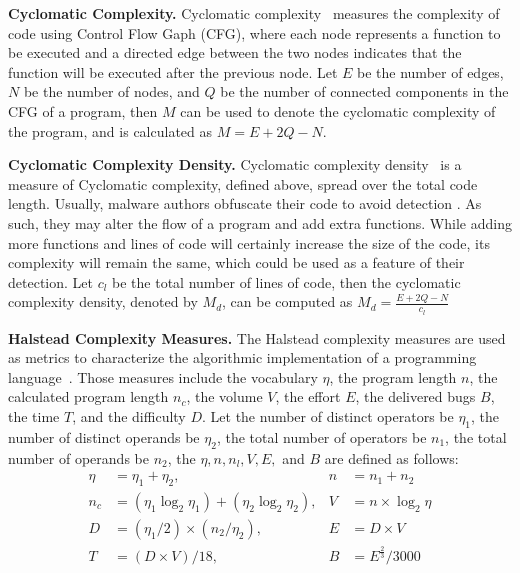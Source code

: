 \documentclass[acmlarge]{acmart}
\newcommand{\BfPara}[1]{{\noindent\bf#1.}\xspace\xspace}
\newcommand{\vs}[1]{{\vspace{-#1mm}}}
\begin{document}
\BfPara{Cyclomatic Complexity} Cyclomatic complexity~\cite{McCabe76,WatsonMW96} measures the complexity of code  using Control Flow Gaph (CFG), where each node represents a function to be executed and a directed edge between the two nodes indicates that the function will be executed after the previous node. Let $E$ be the number of edges, $N$ be the number of nodes, and $Q$ be the number of connected components in the CFG of a program, then $M$ can be used to denote the cyclomatic complexity of the program, and is calculated as $M = E + 2Q - N$.  







\BfPara{Cyclomatic Complexity Density} Cyclomatic complexity density~\cite{FentonN99} is a measure of Cyclomatic complexity, defined above, spread over the total code length. Usually, malware authors obfuscate their code to avoid detection \cite{Galeano17}. As such, they may alter the flow of a program and add extra functions. While adding more functions and lines of code will certainly increase the size of the code, its complexity will remain the same, which could be used as a feature of their detection. Let $c_l$ be the total number of lines of code, then the cyclomatic complexity density, denoted by $M_d$, can be computed as $M_d = \frac{E + 2Q - N}{c_l}$

\BfPara{Halstead Complexity Measures} The Halstead complexity measures are used as metrics to characterize the algorithmic implementation of a programming language~\cite{Serebrenik11}. Those measures include the vocabulary $\eta$, the program length $n$, the calculated program length $n_c$, the volume $V$, the effort $E$, the delivered bugs $B$, the time $T$, and the difficulty $D$. Let the number of distinct operators be $\eta _{1}$, the number of distinct operands be $\eta _{2}$, the total number of operators be $n_1$, the total number of operands be $n_2$, the $\eta, n, n_l, V, E,$ and $B$ are defined as follows:
\vs{0}
\begin{align}\label{equation:halsted} 
    \nonumber\eta &= \eta _{1}+ \eta _{2},  & n &= n_{1}+n_{2}\\
    \nonumber n_c &= (\eta _{1}\log _{2}\eta _{1})+(\eta _{2}\log _{2}\eta _{2}), & V &= n\times \log _{2}\eta\\
    \nonumber D &= (\eta _{1}/ 2)\times (n_{2} / \eta _{2}), & E &= D\times V\\
    \nonumber T &= {(D \times V)}/{18}, & B &= {E^{\frac{2}{3}}}/{3000} 
\end{align}
\end{document}
